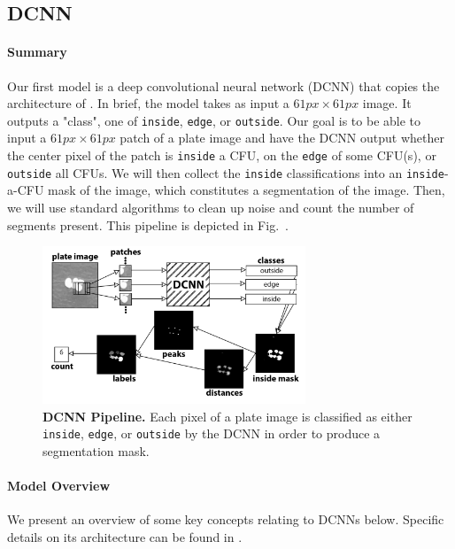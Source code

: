 \documentclass[10pt,letterpaper]{article}
\begin{document}
    \subsection*{DCNN} \label{ssec:dcnn}
        \paragraph*{Summary}
            Our first model is a deep convolutional neural network (DCNN) that copies the architecture of \cite{Valen}. In brief, the model takes as input a $61px \times 61px$ image. It outputs a "class", one of \texttt{inside}, \texttt{edge}, or \texttt{outside}. Our goal is to be able to input a $61px \times 61px$ patch of a plate image and have the DCNN output whether the center pixel of the patch is \texttt{inside} a CFU, on the \texttt{edge} of some CFU(s), or \texttt{outside} all CFUs. We will then collect the \texttt{inside} classifications into an \texttt{inside}-a-CFU mask of the image, which constitutes a segmentation of the image. Then, we will use standard algorithms to clean up noise and count the number of segments present. This pipeline is depicted in Fig.~\cite{dcnn_pipeline}.
            
            \begin{figure}[h]
                \includegraphics[width=0.7\textwidth]{dcnn_pipeline2}
                \caption{{\bf DCNN Pipeline.} Each pixel of a plate image is classified as either \texttt{inside}, \texttt{edge}, or \texttt{outside} by the DCNN in order to produce a segmentation mask.}
                \label{dcnn_pipeline}
            \end{figure}
        
    
        \paragraph*{Model Overview}
            We present an overview of some key concepts relating to DCNNs below. Specific details on its architecture can be found in .
        
\end{document}
